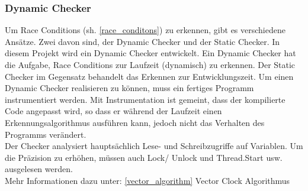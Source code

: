 \documentclass[10pt,a4paper]{article}
\begin{document}
\subsubsection{Dynamic Checker}
\begin{flushleft}
Um Race Conditions (sh. \ref{race_conditons}) zu erkennen, gibt es verschiedene Ansätze. Zwei davon sind, der Dynamic Checker und der Static Checker. In diesem Projekt
wird ein Dynamic Checker entwickelt. Ein Dynamic Checker hat die Aufgabe, Race Conditions zur Laufzeit (dynamisch) zu erkennen. Der Static Checker
im Gegensatz behandelt das Erkennen zur Entwicklungszeit. Um einen Dynamic Checker realisieren zu können, muss ein fertiges Programm instrumentiert werden.
Mit Instrumentation ist gemeint, dass der kompilierte Code angepasst wird, so dass er während der Laufzeit einen Erkennungsalgorithmus ausführen kann, jedoch nicht das Verhalten des Programms verändert.\\
Der Checker analysiert hauptsächlich Lese- und Schreibzugriffe auf Variablen. Um die Präzision zu erhöhen, müssen auch Lock/ Unlock und Thread.Start usw. ausgelesen werden.\\
Mehr Informationen dazu unter: \ref{vector_algorithm} Vector Clock Algorithmus
\end{flushleft}
\end{document}

